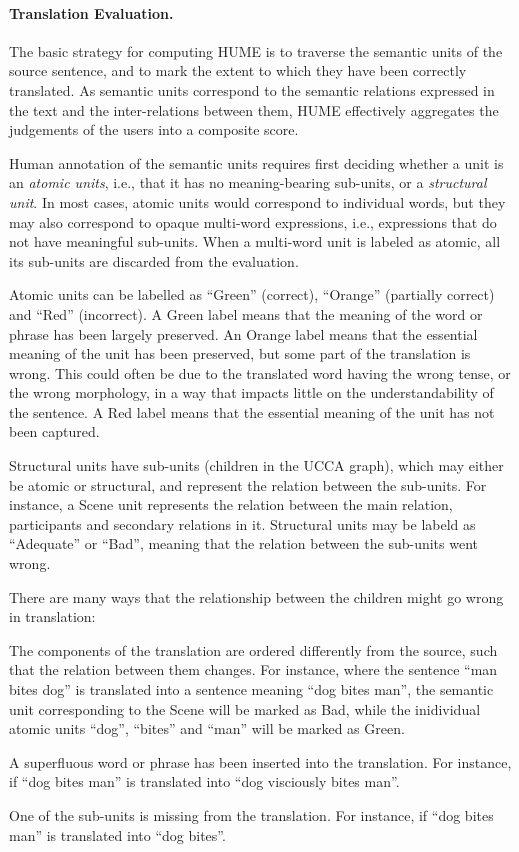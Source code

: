 \documentclass[11pt]{article}
\begin{document}
\paragraph{Translation Evaluation.}
The basic strategy for computing HUME is to traverse
the semantic units of the source sentence, and to mark the extent to which
they have been correctly translated. As semantic units correspond to the
semantic relations expressed in the text and the inter-relations between them,
HUME effectively aggregates the judgements of the users into a composite score.

Human annotation of the semantic units requires first deciding whether
a unit is an {\it atomic units}, i.e., that it has no meaning-bearing
sub-units, or a {\it structural unit}. In most cases, atomic units would
correspond to individual words, but they may also correspond to opaque
multi-word expressions, i.e., expressions that do not have meaningful sub-units.
When a multi-word unit is labeled as atomic, all its sub-units are discarded
from the evaluation.

Atomic units can be labelled as ``Green'' (correct), ``Orange'' (partially correct)
and ``Red'' (incorrect). 
A Green label means that the meaning of the word or phrase has been largely preserved.
An Orange label means that the essential meaning of the unit has been preserved,
but some part of the translation is wrong.
This could often be due to the translated word having the wrong tense,
or the wrong morphology, in a way that impacts little on the understandability of the sentence.
A Red label means that the essential meaning of the unit has not been captured.

Structural units have sub-units (children in the UCCA graph), which may either be
atomic or structural, and represent the relation between the sub-units.
For instance, a Scene unit 
represents the relation between the main relation, participants and secondary
relations in it. Structural units may be labeld as ``Adequate'' or ``Bad'', meaning
that the relation between the sub-units went wrong.

There are many ways that the relationship between the children might go
wrong in translation:

\begin{compactitem}
\item The components of the translation are ordered differently from the source,
  such that the relation between them changes. For instance, where
  the sentence ``man bites dog'' is translated into a sentence meaning ``dog bites man'',
  the semantic unit corresponding to the Scene will be marked as Bad, while
  the inidividual atomic units ``dog'', ``bites'' and ``man'' will be marked as Green.
\item A superfluous word or phrase has been inserted into
  the translation. For instance, if ``dog bites man'' is translated into ``dog visciously bites man''.
\item One of the sub-units is missing from the translation. For instance, if ``dog bites man'' is translated into ``dog bites''.
\end{compactitem}
\end{document}
